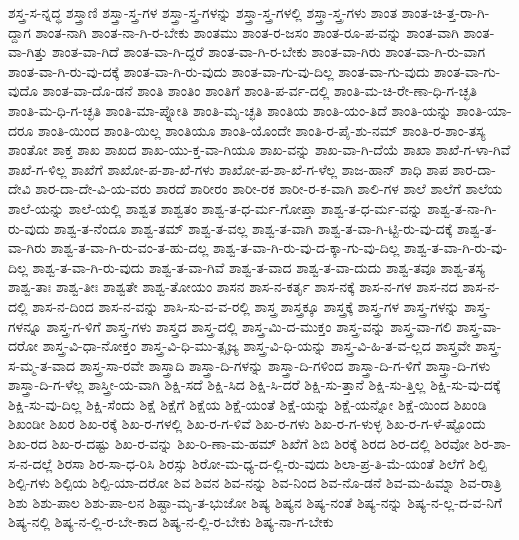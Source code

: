 {ಶಸ್ತ್ರ-ಸ-ನ್ನದ್ಧ
ಶಸ್ತ್ರಾಣಿ
ಶಸ್ತ್ರಾ-ಸ್ತ್ರ-ಗಳ
ಶಸ್ತ್ರಾ-ಸ್ತ್ರ-ಗಳನ್ನು
ಶಸ್ತ್ರಾ-ಸ್ತ್ರ-ಗಳಲ್ಲಿ
ಶಸ್ತ್ರಾ-ಸ್ತ್ರ-ಗಳು
ಶಾಂತ
ಶಾಂತ-ಚಿ-ತ್ತ-ರಾ-ಗಿ-ದ್ದಾಗ
ಶಾಂತ-ನಾಗಿ
ಶಾಂತ-ನಾ-ಗಿ-ರ-ಬೇಕು
ಶಾಂತಮು
ಶಾಂತ-ರ-ಜಸಂ
ಶಾಂತ-ರೂ-ಪ-ವನ್ನು
ಶಾಂತ-ವಾಗಿ
ಶಾಂತ-ವಾ-ಗಿತ್ತು
ಶಾಂತ-ವಾ-ಗಿದೆ
ಶಾಂತ-ವಾ-ಗಿ-ದ್ದರೆ
ಶಾಂತ-ವಾ-ಗಿ-ರ-ಬೇಕು
ಶಾಂತ-ವಾ-ಗಿರು
ಶಾಂತ-ವಾ-ಗಿ-ರು-ವಾಗ
ಶಾಂತ-ವಾ-ಗಿ-ರು-ವು-ದಕ್ಕೆ
ಶಾಂತ-ವಾ-ಗಿ-ರು-ವುದು
ಶಾಂತ-ವಾ-ಗು-ವು-ದಿಲ್ಲ
ಶಾಂತ-ವಾ-ಗು-ವುದು
ಶಾಂತ-ವಾ-ಗು-ವುದೊ
ಶಾಂತ-ವಾ-ದೊ-ಡನೆ
ಶಾಂತಿ
ಶಾಂತಿಂ
ಶಾಂತಿಗೆ
ಶಾಂತಿ-ಪ-ರ್ವ-ದಲ್ಲಿ
ಶಾಂತಿ-ಮ-ಚಿ-ರೇ-ಣಾ-ಧಿ-ಗ-ಚ್ಛತಿ
ಶಾಂತಿ-ಮ-ಧಿ-ಗ-ಚ್ಛತಿ
ಶಾಂತಿ-ಮಾ-ಪ್ನೋತಿ
ಶಾಂತಿ-ಮೃ-ಚ್ಛತಿ
ಶಾಂತಿಯ
ಶಾಂತಿ-ಯಂ-ತಿದೆ
ಶಾಂತಿ-ಯನ್ನು
ಶಾಂತಿ-ಯಾ-ದರೂ
ಶಾಂತಿ-ಯಿಂದ
ಶಾಂತಿ-ಯಿಲ್ಲ
ಶಾಂತಿಯೂ
ಶಾಂತಿ-ಯೊಂದೇ
ಶಾಂತಿ-ರ-ಪೈ-ಶು-ನಮ್
ಶಾಂತಿ-ರ-ಶಾಂ-ತಸ್ಯ
ಶಾಂತೋ
ಶಾಕ್ತ
ಶಾಖ
ಶಾಖದ
ಶಾಖ-ಯು-ಕ್ತ-ವಾ-ಗಿಯೂ
ಶಾಖ-ವನ್ನು
ಶಾಖ-ವಾ-ಗಿ-ದೆಯೆ
ಶಾಖಾ
ಶಾಖೆ-ಗ-ಳಾ-ಗಿವೆ
ಶಾಖೆ-ಗ-ಳಿಲ್ಲ
ಶಾಖೆಗೆ
ಶಾಖೋ-ಪ-ಶಾ-ಖೆ-ಗಳು
ಶಾಖೋ-ಪ-ಶಾ-ಖೆ-ಗ-ಳೆಲ್ಲ
ಶಾಜ-ಹಾನ್
ಶಾಧಿ
ಶಾಪ
ಶಾರ-ದಾ-ದೇವಿ
ಶಾರ-ದಾ-ದೇ-ವಿ-ಯ-ವರು
ಶಾರದೆ
ಶಾರೀರಂ
ಶಾರೀ-ರಕ
ಶಾರೀ-ರ-ಕ-ವಾಗಿ
ಶಾಲಿ-ಗಳ
ಶಾಲೆ
ಶಾಲೆಗೆ
ಶಾಲೆಯ
ಶಾಲೆ-ಯನ್ನು
ಶಾಲೆ-ಯಲ್ಲಿ
ಶಾಶ್ವತ
ಶಾಶ್ವತಂ
ಶಾಶ್ವ-ತ-ಧ-ರ್ಮ-ಗೋಪ್ತಾ
ಶಾಶ್ವ-ತ-ಧ-ರ್ಮ-ವನ್ನು
ಶಾಶ್ವ-ತ-ನಾ-ಗಿ-ರು-ವುದು
ಶಾಶ್ವ-ತ-ನೆಂದೂ
ಶಾಶ್ವ-ತಮ್
ಶಾಶ್ವ-ತ-ವಲ್ಲ
ಶಾಶ್ವ-ತ-ವಾಗಿ
ಶಾಶ್ವ-ತ-ವಾ-ಗಿ-ಟ್ಟಿ-ರು-ವು-ದಕ್ಕೆ
ಶಾಶ್ವ-ತ-ವಾ-ಗಿರು
ಶಾಶ್ವ-ತ-ವಾ-ಗಿ-ರು-ವಂ-ತ-ಹು-ದಲ್ಲ
ಶಾಶ್ವ-ತ-ವಾ-ಗಿ-ರು-ವು-ದ-ಕ್ಕಾ-ಗು-ವು-ದಿಲ್ಲ
ಶಾಶ್ವ-ತ-ವಾ-ಗಿ-ರು-ವು-ದಿಲ್ಲ
ಶಾಶ್ವ-ತ-ವಾ-ಗಿ-ರು-ವುದು
ಶಾಶ್ವ-ತ-ವಾ-ಗಿವೆ
ಶಾಶ್ವ-ತ-ವಾದ
ಶಾಶ್ವ-ತ-ವಾ-ದುದು
ಶಾಶ್ವ-ತವೂ
ಶಾಶ್ವ-ತಸ್ಯ
ಶಾಶ್ವ-ತಾಃ
ಶಾಶ್ವ-ತೀಃ
ಶಾಶ್ವತೇ
ಶಾಶ್ವ-ತೋಯಂ
ಶಾಸನ
ಶಾಸ-ನ-ಕರ್ತೃ
ಶಾಸ-ನಕ್ಕೆ
ಶಾಸ-ನ-ಗಳ
ಶಾಸ-ನದ
ಶಾಸ-ನ-ದಲ್ಲಿ
ಶಾಸ-ನ-ದಿಂದ
ಶಾಸ-ನ-ವನ್ನು
ಶಾಸಿ-ಸು-ವ-ವ-ರಲ್ಲಿ
ಶಾಸ್ತ್ರ
ಶಾಸ್ತ್ರಕ್ಕೂ
ಶಾಸ್ತ್ರಕ್ಕೆ
ಶಾಸ್ತ್ರ-ಗಳ
ಶಾಸ್ತ್ರ-ಗಳನ್ನು
ಶಾಸ್ತ್ರ-ಗಳನ್ನೂ
ಶಾಸ್ತ್ರ-ಗ-ಳಿಗೆ
ಶಾಸ್ತ್ರ-ಗಳು
ಶಾಸ್ತ್ರದ
ಶಾಸ್ತ್ರ-ದಲ್ಲಿ
ಶಾಸ್ತ್ರ-ಮಿ-ದ-ಮುಕ್ತಂ
ಶಾಸ್ತ್ರ-ವನ್ನು
ಶಾಸ್ತ್ರ-ವಾ-ಗಲಿ
ಶಾಸ್ತ್ರ-ವಾ-ದರೋ
ಶಾಸ್ತ್ರ-ವಿ-ಧಾ-ನೋಕ್ತಂ
ಶಾಸ್ತ್ರ-ವಿ-ಧಿ-ಮು-ತ್ಸೃಜ್ಯ
ಶಾಸ್ತ್ರ-ವಿ-ಧಿ-ಯನ್ನು
ಶಾಸ್ತ್ರ-ವಿ-ಹಿ-ತ-ವ-ಲ್ಲದ
ಶಾಸ್ತ್ರವೇ
ಶಾಸ್ತ್ರ-ಸ-ಮ್ಮ-ತ-ವಾದ
ಶಾಸ್ತ್ರ-ಸಾ-ರವೇ
ಶಾಸ್ತ್ರಾದಿ
ಶಾಸ್ತ್ರಾ-ದಿ-ಗಳನ್ನು
ಶಾಸ್ತ್ರಾ-ದಿ-ಗಳಿಂದ
ಶಾಸ್ತ್ರಾ-ದಿ-ಗ-ಳಿಗೆ
ಶಾಸ್ತ್ರಾ-ದಿ-ಗಳು
ಶಾಸ್ತ್ರಾ-ದಿ-ಗ-ಳೆಲ್ಲ
ಶಾಸ್ತ್ರೀ-ಯ-ವಾಗಿ
ಶಿಕ್ಷಿ-ಸದೆ
ಶಿಕ್ಷಿ-ಸಿದ
ಶಿಕ್ಷಿ-ಸಿ-ದರೆ
ಶಿಕ್ಷಿ-ಸು-ತ್ತಾನೆ
ಶಿಕ್ಷಿ-ಸು-ತ್ತಿಲ್ಲ
ಶಿಕ್ಷಿ-ಸು-ವು-ದಕ್ಕೆ
ಶಿಕ್ಷಿ-ಸು-ವು-ದಿಲ್ಲ
ಶಿಕ್ಷಿ-ಸೆಂದು
ಶಿಕ್ಷೆ
ಶಿಕ್ಷೆಗೆ
ಶಿಕ್ಷೆಯ
ಶಿಕ್ಷೆ-ಯಂತೆ
ಶಿಕ್ಷೆ-ಯನ್ನು
ಶಿಕ್ಷೆ-ಯನ್ನೋ
ಶಿಕ್ಷೆ-ಯಿಂದ
ಶಿಖಂಡಿ
ಶಿಖಂಡೀ
ಶಿಖರ
ಶಿಖ-ರಕ್ಕೆ
ಶಿಖ-ರ-ಗಳಲ್ಲಿ
ಶಿಖ-ರ-ಗ-ಳಿವೆ
ಶಿಖ-ರ-ಗಳು
ಶಿಖ-ರ-ಗ-ಳುಳ್ಳ
ಶಿಖ-ರ-ಗ-ಳೆ-ಷ್ಟೊಂದು
ಶಿಖ-ರದ
ಶಿಖ-ರ-ದಷ್ಟು
ಶಿಖ-ರ-ವನ್ನು
ಶಿಖ-ರಿ-ಣಾ-ಮ-ಹಮ್
ಶಿಖೆಗೆ
ಶಿಬಿ
ಶಿರಕ್ಕೆ
ಶಿರದ
ಶಿರ-ದಲ್ಲಿ
ಶಿರವೋ
ಶಿರ-ಶಾ-ಸ-ನ-ದಲ್ಲೆ
ಶಿರಸಾ
ಶಿರ-ಸಾ-ಧ-ರಿಸಿ
ಶಿರಸ್ಸು
ಶಿರೋ-ಮ-ಧ್ಯ-ದ-ಲ್ಲಿ-ರು-ವುದು
ಶಿಲಾ-ಪ್ರ-ತಿ-ಮೆ-ಯಂತೆ
ಶಿಲೆಗೆ
ಶಿಲ್ಪಿ
ಶಿಲ್ಪಿ-ಗಳು
ಶಿಲ್ಪಿಯ
ಶಿಲ್ಪಿ-ಯಾ-ದರೋ
ಶಿವ
ಶಿವನ
ಶಿವ-ನನ್ನು
ಶಿವ-ನಿಂದ
ಶಿವ-ನೊ-ಡನೆ
ಶಿವ-ಮ-ಹಿಮ್ನಾ
ಶಿವ-ರಾತ್ರಿ
ಶಿಶು
ಶಿಶು-ಪಾಲ
ಶಿಶು-ಪಾ-ಲನ
ಶಿಷ್ಟಾ-ಮೃ-ತ-ಭುಜೋ
ಶಿಷ್ಯ
ಶಿಷ್ಯನ
ಶಿಷ್ಯ-ನಂತೆ
ಶಿಷ್ಯ-ನನ್ನು
ಶಿಷ್ಯ-ನ-ಲ್ಲ-ದ-ವ-ನಿಗೆ
ಶಿಷ್ಯ-ನಲ್ಲಿ
ಶಿಷ್ಯ-ನ-ಲ್ಲಿ-ರ-ಬೇ-ಕಾದ
ಶಿಷ್ಯ-ನ-ಲ್ಲಿ-ರ-ಬೇಕು
ಶಿಷ್ಯ-ನಾ-ಗ-ಬೇಕು
}
